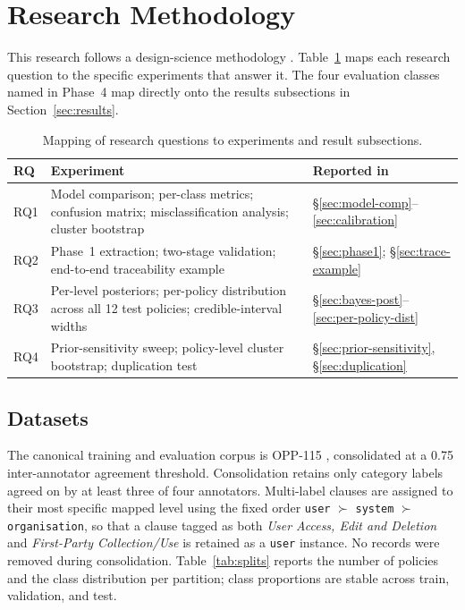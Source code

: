 \documentclass[final,3p,times,twocolumn]{elsarticle}
\begin{document}
	\section{Research Methodology}
	\label{sec:methodology} This research follows a design-science methodology
	\citep{hevner2004design}. Table~\ref{tab:rq-experiments} maps each research
	question to the specific experiments that answer it. The four evaluation classes
	named in Phase~4 map directly onto the results subsections in Section~\ref{sec:results}.
	\begin{table}[h]
		\centering
		\caption{Mapping of research questions to experiments and result subsections.}
		\label{tab:rq-experiments} \footnotesize
		\setlength{\tabcolsep}{3pt}
		\begin{tabular}{@{}l p{} p{}@{}}
			\toprule \textbf{RQ} & \textbf{Experiment}                                                                                  & \textbf{Reported in}                                 \\
			\midrule RQ1         & Model comparison; per-class metrics; confusion matrix; misclassification analysis; cluster bootstrap & §\ref{sec:model-comp}--\ref{sec:calibration}         \\
			RQ2                  & Phase~1 extraction; two-stage validation; end-to-end traceability example                            & §\ref{sec:phase1}; §\ref{sec:trace-example}          \\
			RQ3                  & Per-level posteriors; per-policy distribution across all 12 test policies; credible-interval widths  & §\ref{sec:bayes-post}--\ref{sec:per-policy-dist}     \\
			RQ4                  & Prior-sensitivity sweep; policy-level cluster bootstrap; duplication test                            & §\ref{sec:prior-sensitivity}, §\ref{sec:duplication} \\
			\bottomrule
		\end{tabular}
	\end{table}

	\subsection{Datasets}
	The canonical training and evaluation corpus is OPP-115 \citep{wilson2016opp115,opp115_dataset},
	consolidated at a 0.75 inter-annotator agreement threshold. Consolidation retains
	only category labels agreed on by at least three of four annotators. Multi-label
	clauses are assigned to their most specific mapped level using the fixed order
	\texttt{user} $\succ$ \texttt{system} $\succ$ \texttt{organisation}, so that a
	clause tagged as both \emph{User Access, Edit and Deletion} and \emph{First-Party
	Collection/Use} is retained as a \texttt{user} instance. No records were
	removed during consolidation. Table~\ref{tab:splits} reports the number of policies
	and the class distribution per partition; class proportions are stable across
	train, validation, and test.
\end{document}
